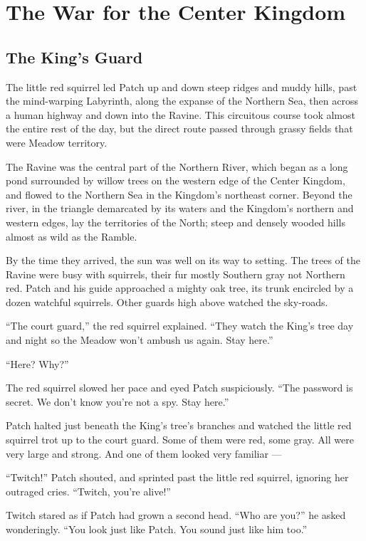 \documentclass[ebook,oneside,openany,12pt]{memoir}
\begin{document}

\chapter{The War for the Center Kingdom}

\section{The King’s Guard}

The little red squirrel led Patch up and down steep ridges and muddy
hills, past the mind-warping Labyrinth, along the expanse of the
Northern Sea, then across a human highway and down into the
Ravine. This circuitous course took almost the entire rest of the day,
but the direct route passed through grassy fields that were Meadow
territory.

The Ravine was the central part of the Northern River, which began as
a long pond surrounded by willow trees on the western edge of the
Center Kingdom, and flowed to the Northern Sea in the Kingdom’s
northeast corner. Beyond the river, in the triangle demarcated by its
waters and the Kingdom’s northern and western edges, lay the
territories of the North; steep and densely wooded hills almost as
wild as the Ramble.

By the time they arrived, the sun was well on its way to setting. The
trees of the Ravine were busy with squirrels, their fur mostly
Southern gray not Northern red. Patch and his guide approached a
mighty oak tree, its trunk encircled by a dozen watchful
squirrels. Other guards high above watched the sky-roads.

“The court guard,” the red squirrel explained. “They watch the King’s
tree day and night so the Meadow won’t ambush us again. Stay here.”

“Here? Why?”

The red squirrel slowed her pace and eyed Patch suspiciously. “The
password is secret. We don’t know you’re not a spy. Stay here.”

Patch halted just beneath the King’s tree’s branches and watched the
little red squirrel trot up to the court guard. Some of them were red,
some gray. All were very large and strong. And one of them looked very
familiar —

“Twitch!” Patch shouted, and sprinted past the little red squirrel,
ignoring her outraged cries. “Twitch, you’re alive!”

Twitch stared as if Patch had grown a second head. “Who are you?” he
asked wonderingly. “You look just like Patch. You sound just like him
too.”
\end{document}
